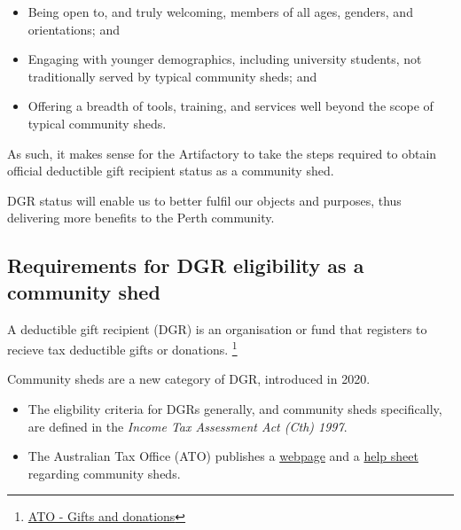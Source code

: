 \documentclass[../constitution.tex]{subfiles}
\begin{document}
\begin{itemize}
    \item Being open to, and truly welcoming, members of all ages, genders, and orientations; and
    \item Engaging with younger demographics, including university students, not traditionally served by typical community sheds; and
    \item Offering a breadth of tools, training, and services well beyond the scope of typical community sheds.
\end{itemize}

As such, it makes sense for the Artifactory to take the steps required to obtain official deductible gift recipient status as a community shed.

DGR status will enable us to better fulfil our objects and purposes, thus delivering more benefits to the Perth community.

\subsection*{Requirements for DGR eligibility as a community shed}

A deductible gift recipient (DGR) is an organisation or fund that registers to recieve tax deductible gifts or donations. \footnote{\href{https://www.ato.gov.au/individuals/income-and-deductions/deductions-you-can-claim/other-deductions/gifts-and-donations/}{ATO - Gifts and donations}}

\bigskip

Community sheds are a new category of DGR, introduced in 2020.

\begin{itemize}
    \item The eligbility criteria for DGRs generally, and community sheds specifically, are defined in the \textit{Income Tax Assessment Act (Cth) 1997}.
    \item The Australian Tax Office (ATO) publishes a \href{https://www.ato.gov.au/Non-profit/Getting-started/In-detail/Types-of-DGRs/Community-sheds/?=redirected_communitysheds}{webpage} and a \href{https://cdn2.app.viostream.com/3da28d19-5792-4397-b158-a4740090a8d8/d1a1ccce-1c54-45f0-9f7e-9a8f63d2d05b/d74a313a-96c3-418e-9390-ac4600afbf00.pdf?response-content-disposition=attachment%3bfilename%3d2020+Help+Sheet+_+Community+Sheds+_+Meeting+DGR+endorsement+_20200921.pdf}{help sheet} regarding community sheds.
\end{itemize}
\end{document}
